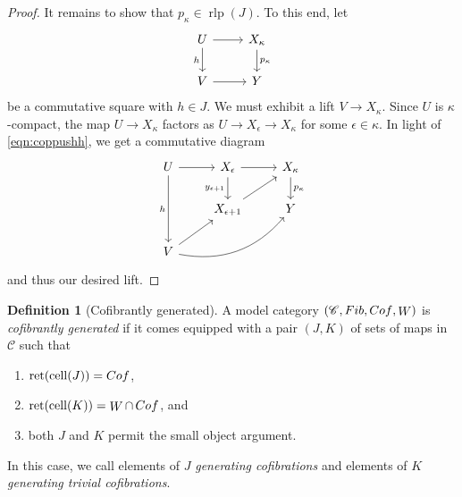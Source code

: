 \documentclass[10pt,letterpaper,cm]{nupset}
\theoremstyle{definition}
\newtheorem{definition}{Definition}[subsection]
\theoremstyle{theorem}
\theoremstyle{remark}
\newcommand{\0}{\mathbf{0}}
\newcommand{\1}{\mathbf{1}}
\newcommand{\2}{\mathbf{2}}
\renewcommand{\c}{\mathscr{C}}
\DeclareMathOperator{\fib}{\mathnormal{Fib}}
\DeclareMathOperator{\cof}{\mathnormal{Cof}}
\DeclareMathOperator{\we}{\mathnormal{W}}
\DeclareMathOperator{\cell}{cell}
\DeclareMathOperator{\ret}{ret}
\DeclareMathOperator{\rlp}{rlp}
\newcommand{\be}{\begin{enumerate}}
\newcommand{\ee}{\end{enumerate}}
\begin{document}
\begin{proof}
It remains to show that  $p_{\kappa} \in \rlp(J)$. To this end, let
\[
\begin{tikzcd}
U \arrow[d, "h"'] \arrow[r] & X_{\kappa} \arrow[d, "p_{\kappa}"] \\
V \arrow[r]                 & Y                                 
\end{tikzcd}
\] be a commutative square with $h\in J$. We must exhibit a lift $V\to X_{\kappa}$. Since $U$ is $\kappa$-compact, the map $U \to X_{\kappa}$ factors as $U \to X_{\epsilon} \to X_{\kappa}$ for some $\epsilon \in \kappa$. In light of \eqref{eqn:coppushh}, we get a commutative diagram
\[
\begin{tikzcd}
U \arrow[r] \arrow[dd, "h"']         & X_{\epsilon} \arrow[r] \arrow[d, "y_{\epsilon+1}"'] & X_{\kappa} \arrow[d, "p_{\kappa}"] \\
                                     & X_{\epsilon+1} \arrow[ru]                         & Y                                  \\
V \arrow[ru] \arrow[rru, bend right] &                                                   &                                   
\end{tikzcd}
\] and thus our desired lift.
\end{proof}

\pagebreak

\begin{definition}[Cofibrantly generated]\label{cofgen}
A model category $\left(\c, \fib, \cof, \we\right)$ is \textit{cofibrantly generated} if it comes equipped with a pair $\left(J, K\right)$ of sets of maps in $\c$ such that
\be[label=(\roman*)]
\item $\ret(\cell(J)) = \cof$,
\item $\ret(\cell(K)) = \we \cap \cof$, and
\item both $J$ and $K$ permit the small object argument.
\ee
In this case, we call elements of $J$ \textit{generating cofibrations} and elements of $K$ \textit{generating trivial cofibrations}.
\end{definition}
\end{document}
